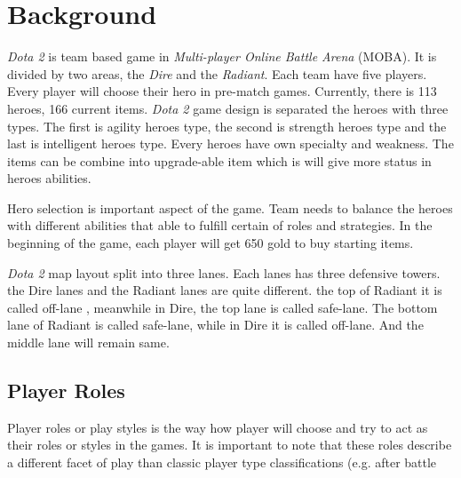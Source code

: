 \section{Background}
\label{sec:background}

\textit{Dota 2} is team based game in \textit{Multi-player Online Battle Arena} (MOBA). It is divided by two areas, the \textit{Dire} and the \textit{Radiant}. Each team have five players. Every player will choose their hero in pre-match games. Currently, there is 113 heroes, 166 current items. \textit{Dota 2} game design is separated the heroes with three types. The first is agility heroes type, the second is strength heroes type and the last is intelligent heroes type. Every heroes have own specialty and weakness. The items can be combine into upgrade-able item which is will give more status in heroes abilities.

Hero selection is important aspect of the game. Team needs to balance the heroes with different abilities that able to fulfill certain of roles and strategies. In the beginning of the game, each player will get 650 gold to buy starting items.

\textit{Dota 2} map layout split into three lanes. Each lanes has three defensive towers. the Dire lanes and the Radiant lanes are quite different. the top of Radiant it is called off-lane , meanwhile in Dire, the top lane is called safe-lane. The bottom lane of Radiant is called safe-lane, while in Dire it is called off-lane. And the middle lane will remain same.

\subsection{Player Roles}
\label{sec:player_roles}

Player roles or play styles is the way how player will choose and try to act as their roles or styles in the games. It is important to note that these roles describe a different facet of play than classic player type classifications (e.g. after battle

